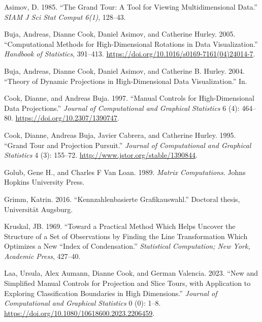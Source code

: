 \hypertarget{refs}{}
\begin{CSLReferences}{1}{0}
\leavevmode{}%
Asimov, D. 1985. {``The Grand Tour: A Tool for Viewing Multidimensional Data.''} \emph{SIAM J Sci Stat Comput 6(1)}, 128--43.

\leavevmode{}%
Buja, Andreas, Dianne Cook, Daniel Asimov, and Catherine Hurley. 2005. {``Computational Methods for High-Dimensional Rotations in Data Visualization.''} \emph{Handbook of Statistics}, 391--413. \url{https://doi.org/10.1016/s0169-7161(04)24014-7}.

\leavevmode{}%
Buja, Andreas, Dianne Cook, Daniel Asimov, and Catherine B. Hurley. 2004. {``Theory of Dynamic Projections in High-Dimensional Data Visualization.''} In.

\leavevmode{}%
Cook, Dianne, and Andreas Buja. 1997. {``Manual Controls for High-Dimensional Data Projections.''} \emph{Journal of Computational and Graphical Statistics} 6 (4): 464--80. \url{https://doi.org/10.2307/1390747}.

\leavevmode{}%
Cook, Dianne, Andreas Buja, Javier Cabrera, and Catherine Hurley. 1995. {``Grand Tour and Projection Pursuit.''} \emph{Journal of Computational and Graphical Statistics} 4 (3): 155--72. \url{http://www.jstor.org/stable/1390844}.

\leavevmode{}%
Golub, Gene H., and Charles F Van Loan. 1989. \emph{Matrix Computations}. Johns Hopkins University Press.

\leavevmode{}%
Grimm, Katrin. 2016. {``Kennzahlenbasierte Grafikauswahl.''} Doctoral thesis, Universit{ä}t Augsburg.

\leavevmode{}%
Kruskal, JB. 1969. {``Toward a Practical Method Which Helps Uncover the Structure of a Set of Observations by Finding the Line Transformation Which Optimizes a New ``Index of Condensation.''} \emph{Statistical Computation; New York, Academic Press}, 427--40.

\leavevmode{}%
Laa, Ursula, Alex Aumann, Dianne Cook, and German Valencia. 2023. {``New and Simplified Manual Controls for Projection and Slice Tours, with Application to Exploring Classification Boundaries in High Dimensions.''} \emph{Journal of Computational and Graphical Statistics} 0 (0): 1--8. \url{https://doi.org/10.1080/10618600.2023.2206459}.


\end{CSLReferences}
